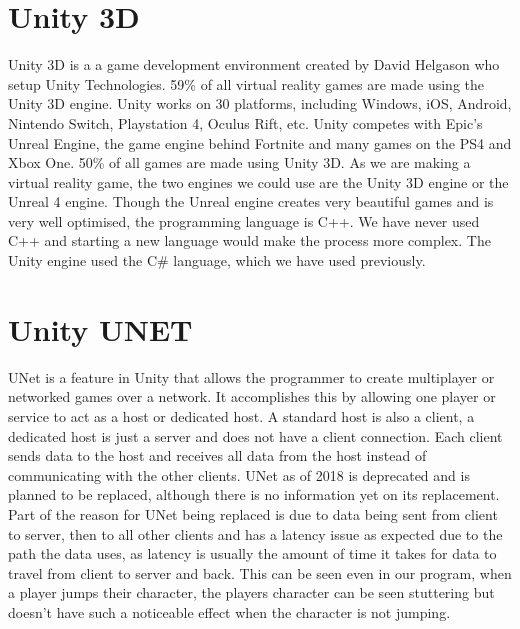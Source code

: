 
\section {Unity 3D}
Unity 3D is a a game development environment created by David Helgason who setup Unity Technologies. 59\% of all virtual reality games are made using the Unity 3D engine. Unity works on 30 platforms, including Windows, iOS, Android, Nintendo Switch, Playstation 4, Oculus Rift, etc. Unity competes with Epic’s Unreal Engine, the game engine behind Fortnite and many games on the PS4 and Xbox One. 50\% of all games are made using Unity 3D. As we are making a virtual reality game, the two engines we could use are the Unity 3D engine or the Unreal 4 engine. Though the Unreal engine creates very beautiful games and is very well optimised, the programming language is C++. We have  never used C++ and starting a new language would make the process more complex. The Unity engine used the C\# language, which we have used previously.

\section {Unity UNET}
UNet is a feature in Unity that allows the programmer to create multiplayer or networked games over a network. It accomplishes this by allowing one player or service to act as a host or dedicated host. A standard host is also a client, a dedicated host is just a server and does not have a client connection. Each client sends data to the host and receives all data from the host instead of communicating with the other clients. UNet as of 2018 is deprecated and is planned to be replaced, although there is no information yet on its replacement. Part of the reason for UNet being replaced is due to data being sent from client to server, then to all other clients and has a latency issue as expected due to the path the data uses, as latency is usually the amount of time it takes for data to travel from client to server and back. This can be seen even in our program, when a player jumps their character, the players character can be seen stuttering but doesn't have such a noticeable effect when the character is not jumping.